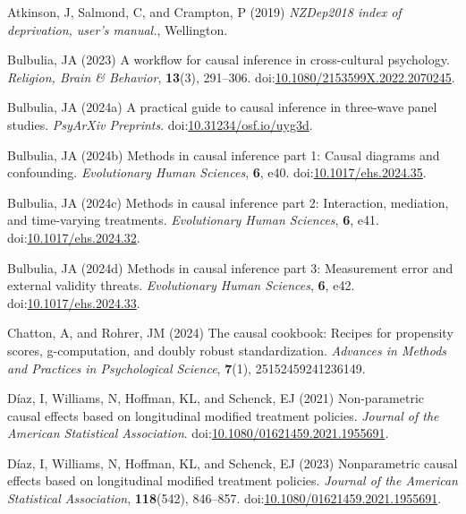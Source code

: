 \documentclass[
  single column]{article}
\newlength{\cslhangindent}
\newenvironment{CSLReferences}[2] %
 {\begin{list}{}{%
  \setlength{\itemindent}{0pt}
  \setlength{\leftmargin}{0pt}
  \setlength{\parsep}{0pt}
  \ifodd #1
   \setlength{\leftmargin}{\cslhangindent}
   \setlength{\itemindent}{-1\cslhangindent}
  \fi
  \setlength{\itemsep}{#2\baselineskip}}}
 {\end{list}}
\begin{document}
\label{refs}
\begin{CSLReferences}{1}{0}
Atkinson, J, Salmond, C, and Crampton, P (2019) \emph{NZDep2018 index of
deprivation, user{'}s manual.}, Wellington.

Bulbulia, JA (2023) A workflow for causal inference in cross-cultural
psychology. \emph{Religion, Brain \& Behavior}, \textbf{13}(3),
291--306.
doi:\href{https://doi.org/10.1080/2153599X.2022.2070245}{10.1080/2153599X.2022.2070245}.

Bulbulia, JA (2024a) A practical guide to causal inference in three-wave
panel studies. \emph{PsyArXiv Preprints}.
doi:\href{https://doi.org/10.31234/osf.io/uyg3d}{10.31234/osf.io/uyg3d}.

Bulbulia, JA (2024b) Methods in causal inference part 1: Causal diagrams
and confounding. \emph{Evolutionary Human Sciences}, \textbf{6}, e40.
doi:\href{https://doi.org/10.1017/ehs.2024.35}{10.1017/ehs.2024.35}.

Bulbulia, JA (2024c) Methods in causal inference part 2: Interaction,
mediation, and time-varying treatments. \emph{Evolutionary Human
Sciences}, \textbf{6}, e41.
doi:\href{https://doi.org/10.1017/ehs.2024.32}{10.1017/ehs.2024.32}.

Bulbulia, JA (2024d) Methods in causal inference part 3: Measurement
error and external validity threats. \emph{Evolutionary Human Sciences},
\textbf{6}, e42.
doi:\href{https://doi.org/10.1017/ehs.2024.33}{10.1017/ehs.2024.33}.

Chatton, A, and Rohrer, JM (2024) The causal cookbook: Recipes for
propensity scores, g-computation, and doubly robust standardization.
\emph{Advances in Methods and Practices in Psychological Science},
\textbf{7}(1), 25152459241236149.

Díaz, I, Williams, N, Hoffman, KL, and Schenck, EJ (2021) Non-parametric
causal effects based on longitudinal modified treatment policies.
\emph{Journal of the American Statistical Association}.
doi:\href{https://doi.org/10.1080/01621459.2021.1955691}{10.1080/01621459.2021.1955691}.

Díaz, I, Williams, N, Hoffman, KL, and Schenck, EJ (2023) Nonparametric
causal effects based on longitudinal modified treatment policies.
\emph{Journal of the American Statistical Association},
\textbf{118}(542), 846--857.
doi:\href{https://doi.org/10.1080/01621459.2021.1955691}{10.1080/01621459.2021.1955691}.


\end{CSLReferences}
\end{document}
